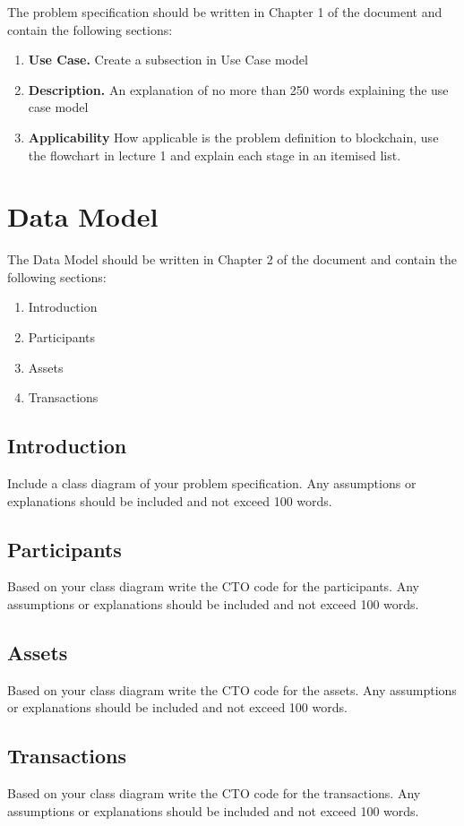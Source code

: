 The problem specification should be written in Chapter 1 of the document and contain the following sections:
\begin{enumerate}
	\item{\bf Use Case.} Create a subsection in Use Case model
	\item{\bf Description.} An explanation of no more than 250 words explaining the use case model
	\item{\bf Applicability} How applicable is the problem definition to blockchain, use the flowchart in lecture 1 and explain each stage in an itemised list.
\end{enumerate}

\section{Data Model}\label{sec:dataModel}
The Data Model should be written in Chapter 2 of the document and contain the following sections:
\begin{enumerate}
	\item Introduction
	\item Participants
	\item Assets
	\item Transactions
\end{enumerate}

\subsection{Introduction}
Include a class diagram of your problem specification. Any assumptions or explanations should be included and not exceed 100 words.


\subsection{Participants}
Based on your class diagram write the CTO code for the participants. Any assumptions or explanations should be included and not exceed 100 words.


\subsection{Assets}
Based on your class diagram write the CTO code for the assets. Any assumptions or explanations should be included and not exceed 100 words.

\subsection{Transactions}
Based on your class diagram write the CTO code for the transactions. Any assumptions or explanations should be included and not exceed 100 words.



